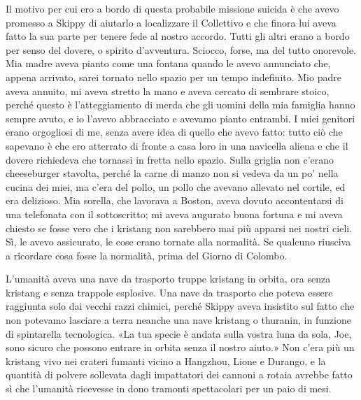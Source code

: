Il motivo per cui ero a bordo di questa probabile missione suicida è che
avevo promesso a Skippy di aiutarlo a localizzare il Collettivo e che
finora lui aveva fatto la sua parte per tenere fede al nostro accordo.
Tutti gli altri erano a bordo per senso del dovere, o spirito
d'avventura. Sciocco, forse, ma del tutto onorevole. Mia madre aveva
pianto come una fontana quando le avevo annunciato che, appena arrivato,
sarei tornato nello spazio per un tempo indefinito. Mio padre aveva
annuito, mi aveva stretto la mano e aveva cercato di sembrare stoico,
perché questo è l'atteggiamento di merda che gli uomini della mia
famiglia hanno sempre avuto, e io l'avevo abbracciato e avevamo pianto
entrambi. I miei genitori erano orgogliosi di me, senza avere idea di
quello che avevo fatto: tutto ciò che sapevano è che ero atterrato di
fronte a casa loro in una navicella aliena e che il dovere richiedeva
che tornassi in fretta nello spazio. Sulla griglia non c'erano
cheeseburger stavolta, perché la carne di manzo non si vedeva da un po'
nella cucina dei miei, ma c'era del pollo, un pollo che avevano allevato
nel cortile, ed era delizioso. Mia sorella, che lavorava a Boston, aveva
dovuto accontentarsi di una telefonata con il sottoscritto; mi aveva
augurato buona fortuna e mi aveva chiesto se fosse vero che i kristang
non sarebbero mai più apparsi nei nostri cieli. Sì, le avevo assicurato,
le cose erano tornate alla normalità. Se qualcuno riusciva a ricordare
cosa fosse la normalità, prima del Giorno di Colombo.

L'umanità aveva una nave da trasporto truppe kristang in orbita, ora
senza kristang e senza trappole esplosive. Una nave da trasporto che
poteva essere raggiunta solo dai vecchi razzi chimici, perché Skippy
aveva insistito sul fatto che non potevamo lasciare a terra neanche una
nave kristang o thuranin, in funzione di spintarella tecnologica. «La
tua specie è andata sulla vostra luna da sola, Joe, sono sicuro che
possono entrare in orbita senza il nostro aiuto.» Non c'era più un
kristang vivo nei crateri fumanti vicino a Hangzhou, Lione e Durango, e
la quantità di polvere sollevata dagli impattatori dei cannoni a rotaia
avrebbe fatto sì che l'umanità ricevesse in dono tramonti spettacolari
per un paio di mesi.

